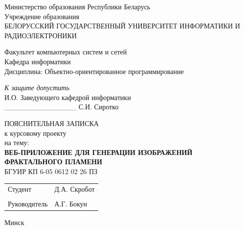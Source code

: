 \newpage
\thispagestyle{empty}

\begin{center}
  Министерство образования Республики Беларусь \\
  Учреждение образования \\
  \uppercase{Белорусский государственный университет информатики и радиоэлектроники}
\end{center}

\begingroup
\raggedright
Факультет компьютерных систем и сетей \\
Кафедра информатики \\
Дисциплина: Объектно-ориентированное программирование \\
\endgroup

\vspace{2\baselineskip}

\hfill\begin{minipage}{0.475\textwidth}
  \raggedright
  \textit{К защите допустить} \\
  И.О. Заведующего кафедрой информатики \\
  \_\_\_\_\_\_\_\_\_\_\_\_\_\_ С.И. Сиротко
\end{minipage}

\vspace{2\baselineskip}

\begin{center}
  \uppercase{Пояснительная записка} \\
  к курсовому проекту \\
  на тему: \\
  \vspace{\baselineskip}
  \uppercase{\textbf{Веб-приложение для генерации изображений фрактального пламени}} \\
  \vspace{1\baselineskip}
  БГУИР КП 6-05 0612 02 26 ПЗ
\end{center}

\vspace{\baselineskip}

\begin{center}
  \begin{tabularx}{\textwidth}{ X l }
    Студент      \hfill & Д.А. Скробот \hspace{2em} \\
                        &                           \\
    Руководитель        & А.Г. Бокун                \\   
  \end{tabularx}
\end{center}

\vspace{\fill}

\centerline{Минск \the\year{}}